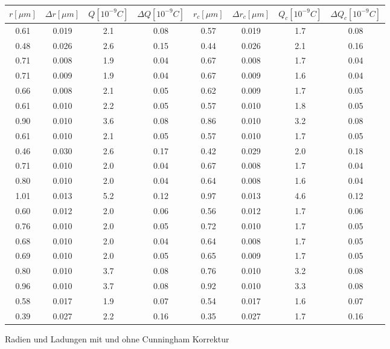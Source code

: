 \documentclass{scrartcl}
\begin{document}
                    \begin{figure}[H]
                        \centering
                        \begin{tabular}{c| c| c| c| c| c| c| c}
                            \hline
                            $r [\mu m]$ & $\Delta r [\mu m] $& $Q [10^{-9} C]$ & $\Delta Q [10^{-9} C]$ & $r_c [\mu m]$ & $\Delta r_c [\mu m]$ & $Q_c [10^{-9} C]$& $\Delta Q_c [10^{-9} C]$\\
                            \hline
                            0.61 & 0.019 & 2.1 & 0.08 & 0.57 & 0.019 & 1.7 & 0.08\\
                            0.48 & 0.026 & 2.6 & 0.15 & 0.44 & 0.026 & 2.1 & 0.16\\
                            0.71 & 0.008 & 1.9 & 0.04 & 0.67 & 0.008 & 1.7 & 0.04\\
                            0.71 & 0.009 & 1.9 & 0.04 & 0.67 & 0.009 & 1.6 & 0.04\\
                            0.66 & 0.008 & 2.1 & 0.05 & 0.62 & 0.009 & 1.7 & 0.05\\
                            0.61 & 0.010 & 2.2 & 0.05 & 0.57 & 0.010 & 1.8 & 0.05\\
                            0.90 & 0.010 & 3.6 & 0.08 & 0.86 & 0.010 & 3.2 & 0.08\\
                            0.61 & 0.010 & 2.1 & 0.05 & 0.57 & 0.010 & 1.7 & 0.05\\
                            0.46 & 0.030 & 2.6 & 0.17 & 0.42 & 0.029 & 2.0 & 0.18\\
                            0.71 & 0.010 & 2.0 & 0.04 & 0.67 & 0.008 & 1.7 & 0.04\\
                            0.80 & 0.010 & 2.0 & 0.04 & 0.64 & 0.008 & 1.6 & 0.04\\
                            1.01 & 0.013 & 5.2 & 0.12 & 0.97 & 0.013 & 4.6 & 0.12\\
                            0.60 & 0.012 & 2.0 & 0.06 & 0.56 & 0.012 & 1.7 & 0.06\\
                            0.76 & 0.010 & 2.0 & 0.05 & 0.72 & 0.010 & 1.7 & 0.05\\
                            0.68 & 0.010 & 2.0 & 0.04 & 0.64 & 0.008 & 1.7 & 0.05\\
                            0.69 & 0.010 & 2.0 & 0.05 & 0.65 & 0.009 & 1.7 & 0.05\\
                            0.80 & 0.010 & 3.7 & 0.08 & 0.76 & 0.010 & 3.2 & 0.08\\
                            0.96 & 0.010 & 3.7 & 0.08 & 0.92 & 0.010 & 3.3 & 0.08\\
                            0.58 & 0.017 & 1.9 & 0.07 & 0.54 & 0.017 & 1.6 & 0.07\\
                            0.39 & 0.027 & 2.2 & 0.16 & 0.35 & 0.027 & 1.7 & 0.16\\
                       \end{tabular}
                       \caption{Radien und Ladungen mit und ohne Cunningham Korrektur}
                       \label{Tab2}
                    \end{figure}
\end{document}
